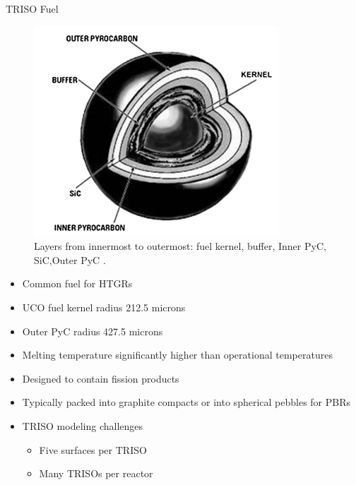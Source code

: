 \documentclass[9pt,t,aspectratio=169]{beamer}
\begin{document}
\begin{frame}{TRISO Fuel}
    \begin{minipage}[t]{0.45\linewidth}
        \pause
        \begin{figure}
            \centering
            \includegraphics[width=0.9\linewidth]{figures/TRISO_diagram_Zhou_Tang.png}
            \caption{Layers from innermost to outermost: fuel kernel, buffer, Inner PyC, SiC,Outer PyC \cite{zhou_tang}.}
        \end{figure}
    \end{minipage}
    \hfill%
    \begin{minipage}[t]{0.45\linewidth}
        \pause
        \begin{itemize}
            \item<3-> Common fuel for HTGRs
            \item<4-> UCO fuel kernel radius 212.5 microns
            \item<5-> Outer PyC radius 427.5 microns
            \item<6-> Melting temperature significantly higher than operational temperatures \cite{zhou_tang}
            \item<7-> Designed to contain fission products \cite{zhou_tang}
            \item<8-> Typically packed into graphite compacts or into spherical pebbles for PBRs
            \item<9-> TRISO modeling challenges
            \begin{itemize}
                \item<10-> Five surfaces per TRISO
                \item<11-> Many TRISOs per reactor
            \end{itemize}
        \end{itemize}
    \end{minipage}
\end{frame}
\end{document}
